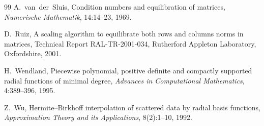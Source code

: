 \documentclass[11pt,a4paper]{article}
\theoremstyle{definition}
\begin{document}
\begin{thebibliography}{99}
A.~van~der~Sluis,
\newblock Condition numbers and equilibration of matrices,
\newblock \emph{Numerische Mathematik}, 14:14--23, 1969.

D.~Ruiz,
\newblock A scaling algorithm to equilibrate both rows and columns
norms in matrices,
\newblock Technical Report RAL-TR-2001-034, Rutherford Appleton
Laboratory, Oxfordshire, 2001.

H.~Wendland,
\newblock Piecewise polynomial, positive definite and compactly
supported radial functions of minimal degree,
\newblock \emph{Advances in Computational Mathematics}, 4:389--396,
1995.

Z.~Wu,
\newblock Hermite--{B}irkhoff interpolation of scattered data by
radial basis functions,
\newblock \emph{Approximation Theory and its Applications},
8(2):1--10, 1992.

\end{thebibliography}
\end{document}
